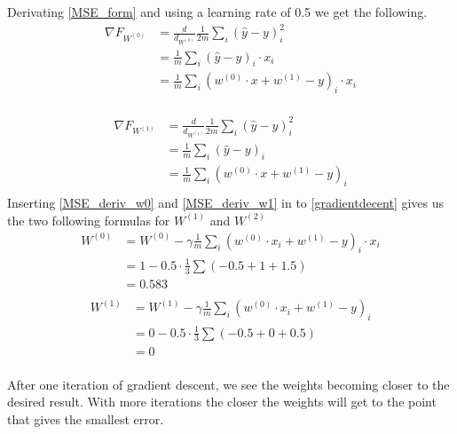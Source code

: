Derivating \ref{MSE_form} and using a learning rate of 0.5 we get the following. 
\begin{equation}
	\label{MSE_deriv_w0}
	\begin{split}
    \nabla F_{W^{(0)}} &= \frac{d}{d_{W^{(0)}} } \frac{1}{2m} \sum_i (\hat{y}-y)_i^2 \\
     &= \frac{1}{m} \sum_{i}{(\hat{y}-y)}_{i} \cdot x_i\\
     &= \frac{1}{m} \sum_{i}{(w^{(0)} \cdot x + w^{(1)}-y)}_{i} \cdot x_i\\
	\end{split}
\end{equation}

\begin{equation}
	\label{MSE_deriv_w1}
	\begin{split}
     \nabla F_{W^{(1)}} &= \frac{d}{d_{W^{(1)}} } \frac{1}{2m} \sum_i (\hat{y}-y)_i^2 \\
				    &= \frac{1}{m} \sum_{i}{(\hat{y}-y)}_{i} \\
				    &= \frac{1}{m} \sum_{i}{(w^{(0)} \cdot x + w^{(1)}-y)}_{i}\\
    \end{split}
\end{equation}
Inserting \ref{MSE_deriv_w0} and \ref{MSE_deriv_w1} in to \ref{gradientdecent} gives us the two following formulas for $W^{(1)}$ and $W^{(2)}$
\begin{equation}
	\label{GD_W0}
	\begin{split}
    W^{(0)}  &= W^{(0)} - \gamma \frac{1}{m} \sum_{i}{(w^{(0)} \cdot x_i + w^{(1)}-y)}_{i} \cdot x_i \\
     		 &= 1 - 0.5 \cdot \frac{1}{3}  \sum (-0.5+1+1.5)  \\
     		 &= 0.583\\
	\end{split}
\end{equation}
\begin{equation}
	\label{GD_W0}
	\begin{split}
    W^{(1)}  &= W^{(1)} - \gamma \frac{1}{m} \sum_{i}{(w^{(0)} \cdot x_i + w^{(1)}-y)}_{i} \\
     		 &= 0 - 0.5 \cdot \frac{1}{3} \sum (-0.5+0+0.5) \\
     		 &= 0\\
	\end{split}
\end{equation}

After one iteration of gradient descent, we see the weights becoming closer to the desired result. With more iterations the closer the weights will get to the point that gives the smallest error. 

